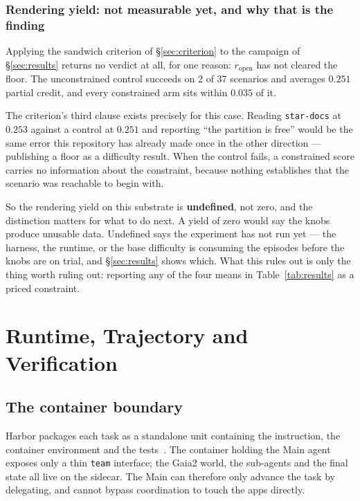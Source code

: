 \documentclass[11pt,a4paper]{article}
\begin{document}
\subsubsection*{Rendering yield: not measurable yet, and why that is the finding}

Applying the sandwich criterion of \S\ref{sec:criterion} to the campaign of \S\ref{sec:results} returns no verdict at all, for one reason: $r_{\mathrm{open}}$ has not cleared the floor. The unconstrained control succeeds on 2 of 37 scenarios and averages $0.251$ partial credit, and every constrained arm sits within $0.035$ of it.

The criterion's third clause exists precisely for this case. Reading \texttt{star-docs} at $0.253$ against a control at $0.251$ and reporting ``the partition is free'' would be the same error this repository has already made once in the other direction --- publishing a floor as a difficulty result. When the control fails, a constrained score carries no information about the constraint, because nothing establishes that the scenario was reachable to begin with.

So the rendering yield on this substrate is \textbf{undefined}, not zero, and the distinction matters for what to do next. A yield of zero would say the knobs produce unusable data. Undefined says the experiment has not run yet --- the harness, the runtime, or the base difficulty is consuming the episodes before the knobs are on trial, and \S\ref{sec:results} shows which. What this rules out is only the thing worth ruling out: reporting any of the four means in Table~\ref{tab:results} as a priced constraint.

\section{Runtime, Trajectory and Verification}

\subsection{The container boundary}
\label{sec:boundary}

Harbor packages each task as a standalone unit containing the instruction, the container environment and the tests~\cite{harbor2026tasks}. The container holding the Main agent exposes only a thin \texttt{team} interface; the Gaia2 world, the sub-agents and the final state all live on the sidecar. The Main can therefore only advance the task by delegating, and cannot bypass coordination to touch the apps directly.
\end{document}
